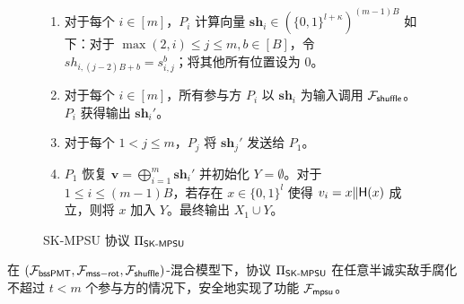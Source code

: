 \begin{figure}[!htb]
\begin{framed}
\begin{minipage}[center]{\textwidth}
\begin{trivlist}
\begin{enumerate} [itemsep=2pt,topsep=0pt,parsep=0pt]
\begin{itemize} [itemsep=1pt,topsep=0pt,parsep=0pt,leftmargin=10pt]
\end{itemize}
\item 对于每个 $i \in [m]$，$P_i$ 计算向量 $\textbf{sh}_i \in (\{0,1\}^{l+\kappa})^{(m-1)B}$ 如下：对于 $\max(2,i) \le j \le m, b \in [B]$，令 $sh_{i,(j-2)B+b} = s_{i,j}^b$；将其他所有位置设为 $0$。
\item 对于每个 $i \in [m]$，所有参与方 $P_i$ 以 $\textbf{sh}_i$ 为输入调用 $\mathcal{F}_\mathsf{shuffle}$。$P_i$ 获得输出 $\textbf{sh}_{i}'$。
\item 对于每个 $1 < j \le m$，$P_j$ 将 $\textbf{sh}_{j}'$ 发送给 $P_1$。
\item $P_1$ 恢复 $\textbf{v} = \bigoplus_{i=1}^m \textbf{sh}_{i}'$ 并初始化 $Y = \emptyset$。对于 $1 \le i \le (m-1)B$，若存在 $x \in \{0,1\}^l$ 使得 $v_i = x \Vert \mathsf{H}(x)$ 成立，则将 $x$ 加入 $Y$。最终输出 $X_1 \cup Y$。
\end{enumerate}
\end{trivlist}
\end{minipage}
\end{framed}
\caption{SK-MPSU 协议 $\Pi_\mathsf{SK\text{-}MPSU}$}\label{fig:proto-mpsu2}
\end{figure}

\begin{theorem} \label{theorem:ske}
在 $(\mathcal{F}_\mathsf{bssPMT}, \mathcal{F}_\mathsf{mss\mathsf{-}rot}, \mathcal{F}_\mathsf{shuffle})$-混合模型下，协议 $\Pi_\mathsf{SK\text{-}MPSU}$ 在任意半诚实敌手腐化不超过 $t < m$ 个参与方的情况下，安全地实现了功能 $\mathcal{F}_\mathsf{mpsu}$。
\end{theorem}

